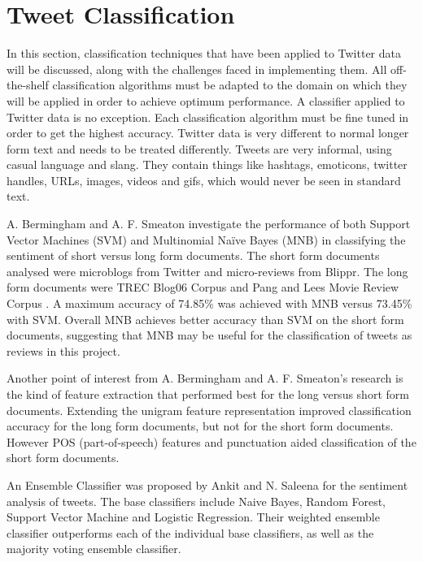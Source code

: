 \section{Tweet Classification}

In this section, classification techniques that have been applied to Twitter data will be discussed, along with the challenges faced in implementing them. All off-the-shelf classification algorithms must be adapted to the domain on which they will be applied in order to achieve optimum performance. A classifier applied to Twitter data is no exception. Each classification algorithm must be fine tuned in order to get the highest accuracy. Twitter data is very different to normal longer form text and needs to be treated differently. Tweets are very informal, using casual language and slang. They contain things like hashtags, emoticons, twitter handles, URLs, images, videos and gifs, which would never be seen in standard text.

A. Bermingham and A. F. Smeaton \cite{Berm2010} investigate the performance of both Support Vector Machines (SVM) and Multinomial Naïve Bayes (MNB) in classifying the sentiment of short versus long form documents. The short form documents analysed were microblogs from Twitter and micro-reviews from Blippr. The long form documents were TREC Blog06 Corpus and Pang and Lees Movie Review Corpus \cite{panglee2004}. A maximum accuracy of 74.85\% was achieved with MNB versus 73.45\% with SVM. Overall MNB achieves better accuracy than SVM on the short form documents, suggesting that MNB may be useful for the classification of tweets as reviews in this project.

Another point of interest from A. Bermingham and A. F. Smeaton's research is the kind of feature extraction that performed best for the long versus short form documents. Extending the unigram feature representation improved classification accuracy for the long form documents, but not for the short form documents. However POS (part-of-speech) features and punctuation aided classification of the short form documents. 

An Ensemble Classifier was proposed by Ankit and N. Saleena \cite{Ankit2018} for the sentiment analysis of tweets. The base classifiers include Naive Bayes, Random Forest, Support Vector Machine and Logistic Regression. Their weighted ensemble classifier outperforms each of the individual base classifiers, as well as the majority voting ensemble classifier.


